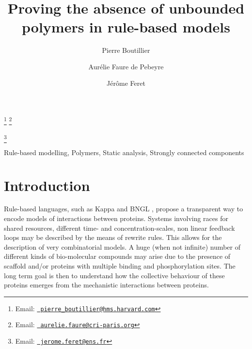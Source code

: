 \documentclass{entcs}
\begin{document}
\begin{frontmatter}
  \title{Proving the absence of unbounded polymers in rule-based models} \author{Pierre Boutillier}
  \address{Harvard Medical School, \\ Department of Systems Biology, Boston, MA 02115, USA}
  \author{Aur\'elie Faure de Pebeyre}
\address{Centre de recherche interdisciplinaire, 75004 Paris, France}
\address{INRIA, \\ Centre de recherche INRIA de Paris, 75 012 Paris, France}
\address{D\'{e}partement d'informatique de l'\'{E}cole normale sup\'{e}rieure,\\
\'Ecole normale sup\'erieure, CNRS, PSL Research University,
75 005 Paris, France}
  \author{J\'{e}r\^{o}me Feret}
  \address{INRIA, \\ Centre de recherche INRIA de Paris, 75 012 Paris, France}
  \address{D\'{e}partement d'informatique de l'\'{E}cole normale sup\'{e}rieure,\\
  \'Ecole normale sup\'erieure, CNRS, PSL Research University,
  75 005 Paris, France}
\thanks[pbemail]{Email:
    \href{mailto:pierre\_boutillier@hms.harvard.com} {\texttt{\normalshape
        pierre\_boutillier@hms.harvard.com}}}
\thanks[afemail]{Email:
            \href{mailto:aurelie.faure@cri-paris.org} {\texttt{\normalshape
        aurelie.faure@cri-paris.org}}}

\thanks[jfemail]{Email:
    \href{mailto:jerome.feret@ens.fr} {\texttt{\normalshape
        jerome.feret@ens.fr}}}
\begin{abstract}

\end{abstract}
\begin{keyword}
  Rule-based modelling,
Polymers,
Static analysis,
Strongly connected components
\end{keyword}
\end{frontmatter}



\section{Introduction}

Rule-based languages, such as Kappa \cite{DBLP:journals/tcs/DanosL04} and BNGL
\cite{BNGL}, propose a transparent way to encode models of interactions between proteins.  Systems involving races for shared resources, different time- and concentration-scales, non linear feedback loops may be described by the means of rewrite rules. This allows for the description of very combinatorial models.   A huge (when not infinite) number of different kinds of bio-molecular compounds may arise due to the presence of scaffold and/or proteins with multiple binding and phosphorylation sites. The long term goal is then to understand how the collective behaviour of these proteins emerges from the mechanistic interactions between proteins.
\end{document}
